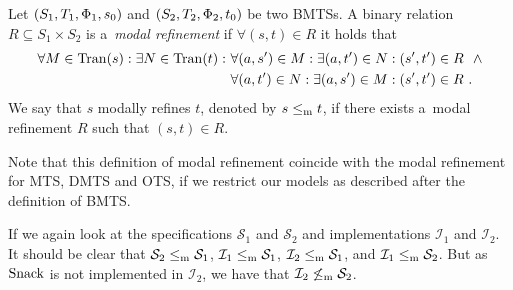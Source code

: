 \begin{definition}\label{def:bool-mr}
Let $(S_1,T_1,\mathrm{\Phi}_1,s_0)$ and $(S_2,T_2,\mathrm{\Phi}_2,t_0)$ be two BMTSs. 
A binary relation
$R \subseteq S_1 \times S_2$ is a~\emph{modal refinement} if $\forall (s,t) \in R$ it holds that
\begin{align*}  
 \forall M \in \mathrm{Tran}(s) : \exists N \in \mathrm{Tran}(t) : 
        & \ \forall (a,s') \in M : \exists (a,t') \in N : (s',t') \in R \ \ \wedge \\
                &\ \forall (a,t') \in N : \exists (a,s') \in M : (s',t') \in R\ .
\end{align*}
We say that $s$ modally refines $t$, denoted by $s \le_\mathrm m t$, if there
exists a~modal refinement $R$ such that $(s,t) \in R$.
\end{definition}

Note that this definition of modal refinement coincide with the modal refinement for MTS, DMTS and OTS, if we restrict our models as described after the definition of BMTS. 

\begin{example}
If we again look at the specifications $\mathcal{S}_1$ and $\mathcal{S}_2$ and implementations $\mathcal{I}_1$ and $\mathcal{I}_2$. %
It should be clear that $\mathcal{S}_2 \le_\mathrm m \mathcal{S}_1$, $\mathcal{I}_1 \le_\mathrm m \mathcal{S}_1$, $\mathcal{I}_2 \le_\mathrm m \mathcal{S}_1$, and $\mathcal{I}_1 \le_\mathrm m \mathcal{S}_2$. But as $\text{Snack}$ is not implemented in $\mathcal{I}_2$, we have that $\mathcal{I}_2 \not\le_\mathrm m \mathcal{S}_2$.
\end{example}